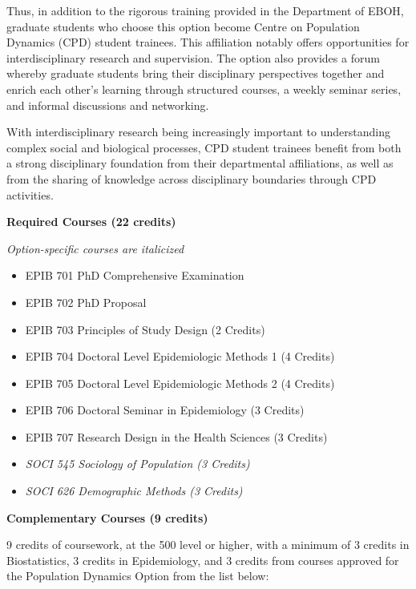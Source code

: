 \documentclass[
  letterpaper,
  DIV=11,
  numbers=noendperiod]{scrreprt}
\providecommand{\tightlist}{%
  \setlength{\itemsep}{0pt}\setlength{\parskip}{0pt}}
\begin{document}
Thus, in addition to the rigorous training provided in the Department of
EBOH, graduate students who choose this option become Centre on
Population Dynamics (CPD) student trainees. This affiliation notably
offers opportunities for interdisciplinary research and supervision. The
option also provides a forum whereby graduate students bring their
disciplinary perspectives together and enrich each other's learning
through structured courses, a weekly seminar series, and informal
discussions and networking.

With interdisciplinary research being increasingly important to
understanding complex social and biological processes, CPD student
trainees benefit from both a strong disciplinary foundation from their
departmental affiliations, as well as from the sharing of knowledge
across disciplinary boundaries through CPD activities.

\textbf{Required Courses (22 credits)}

\emph{Option-specific courses are italicized}

\begin{itemize}
\tightlist
\item
  EPIB 701 PhD Comprehensive Examination
\item
  EPIB 702 PhD Proposal
\item
  EPIB 703 Principles of Study Design (2 Credits)
\item
  EPIB 704 Doctoral Level Epidemiologic Methods 1 (4 Credits)
\item
  EPIB 705 Doctoral Level Epidemiologic Methods 2 (4 Credits)
\item
  EPIB 706 Doctoral Seminar in Epidemiology (3 Credits)
\item
  EPIB 707 Research Design in the Health Sciences (3 Credits)
\item
  \emph{SOCI 545 Sociology of Population (3 Credits)}
\item
  \emph{SOCI 626 Demographic Methods (3 Credits)}
\end{itemize}

\textbf{Complementary Courses (9 credits)}

9 credits of coursework, at the 500 level or higher, with a minimum of 3
credits in Biostatistics, 3 credits in Epidemiology, and 3 credits from
courses approved for the Population Dynamics Option from the list below:
\end{document}
